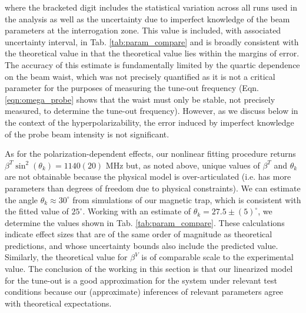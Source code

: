 	 where the bracketed digit includes the statistical variation across all runs used in the analysis as well as the uncertainty due to imperfect knowledge of the beam parameters at the interrogation zone. 
	This value is included, with associated uncertainty interval, in Tab. \ref{tab:param_compare} and is broadly consistent with the theoretical value in that the theoretical value lies within the margins of error.
	The accuracy of this estimate is fundamentally limited by the quartic dependence on the beam waist, which was not precisely quantified as it is not a critical parameter for the purposes of measuring the tune-out frequency (Eqn. \ref{eqn:omega_probe} shows that the waist must only be stable, not precisely measured, to determine the tune-out frequency). However, as we discuss below in the context of the hyperpolarizability, the error induced by imperfect knowledge of the probe beam intensity is not significant.

	As for the polarization-dependent effects, our nonlinear fitting procedure returns $\beta^T\sin^2(\theta_k)=1140(20)$ MHz but, as noted above, unique values of $\beta^T$ and $\theta_k$ are not obtainable because the physical model is over-articulated (i.e. has more parameters than degrees of freedom due to physical constraints). 
	We can estimate the angle $\theta_k\approx 30^\circ$ from simulations of our magnetic trap, which is consistent with the fitted value of $25^\circ$. 
	Working with an estimate of $\theta_k = 27.5\pm(5)^\circ$, we determine the values shown in Tab. \ref{tab:param_compare}. 
	These calculations indicate effect sizes that are of the same order of magnitude as theoretical predictions, and whose uncertainty bounds also include the predicted value.
	Similarly, the theoretical value for $\beta^V$ is of comparable scale to the experimental value.
	The conclusion of the working in this section is that our linearized model for the tune-out is a good approximation for the system under relevant test conditions because our (approximate) inferences of relevant parameters agree with theoretical expectations.

